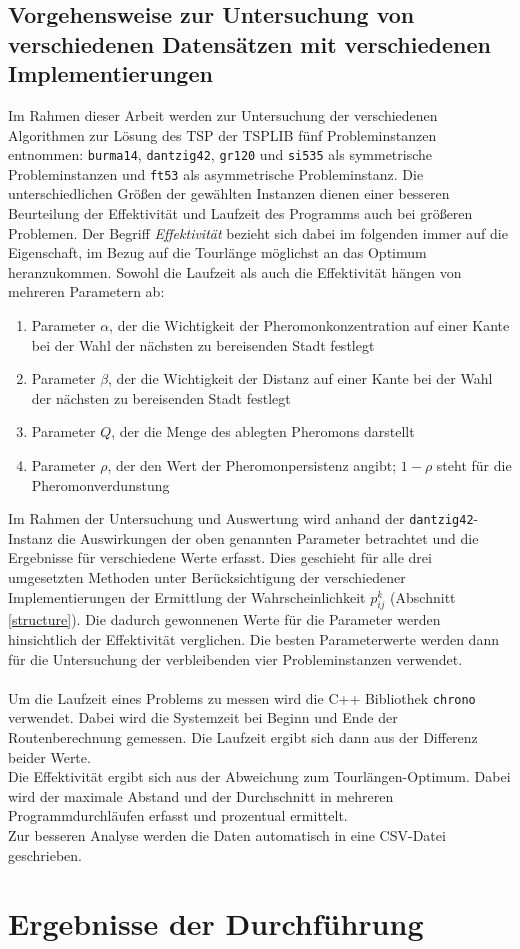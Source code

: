 \documentclass[doktyp=barbeit, sprache=german]{TUBAFarbeiten}
\begin{document}
\subsection{Vorgehensweise zur Untersuchung von verschiedenen Datensätzen mit verschiedenen Implementierungen}
Im Rahmen dieser Arbeit werden zur Untersuchung der verschiedenen Algorithmen zur Lösung des TSP der TSPLIB fünf Probleminstanzen entnommen: \texttt{burma14}, \texttt{dantzig42}, \texttt{gr120} und \texttt{si535} als symmetrische Probleminstanzen und \texttt{ft53} als asymmetrische Probleminstanz.
Die unterschiedlichen Größen der gewählten Instanzen dienen einer besseren Beurteilung der Effektivität und Laufzeit des Programms auch bei größeren Problemen.
Der Begriff \textit{Effektivität} bezieht sich dabei im folgenden immer auf die Eigenschaft, im Bezug auf die Tourlänge möglichst an das Optimum heranzukommen. Sowohl die Laufzeit als auch die Effektivität hängen von mehreren Parametern ab:
\begin{enumerate}
\item Parameter $\alpha$, der die Wichtigkeit der Pheromonkonzentration auf einer Kante bei der Wahl der nächsten zu bereisenden Stadt festlegt
\item Parameter $\beta$, der die Wichtigkeit der Distanz auf einer Kante bei der Wahl der nächsten zu bereisenden Stadt festlegt
\item Parameter $Q$, der die Menge des ablegten Pheromons darstellt
\item Parameter $\rho$, der den Wert der Pheromonpersistenz angibt; $1 - \rho$ steht für die Pheromonverdunstung
\end{enumerate}
Im Rahmen der Untersuchung und Auswertung wird anhand der \texttt{dantzig42}-Instanz die Auswirkungen der oben genannten Parameter betrachtet und die Ergebnisse für verschiedene Werte erfasst.
Dies geschieht für alle drei umgesetzten Methoden unter Berücksichtigung der verschiedener Implementierungen der Ermittlung der Wahrscheinlichkeit $p^k_{ij}$ (Abschnitt \ref{structure}).
Die dadurch gewonnenen Werte für die Parameter werden hinsichtlich der Effektivität verglichen. Die besten Parameterwerte werden dann für die Untersuchung der verbleibenden vier Probleminstanzen verwendet. 
\\\\Um die Laufzeit eines Problems zu messen wird die C++ Bibliothek \texttt{chrono} verwendet. Dabei wird die Systemzeit bei Beginn und Ende der Routenberechnung gemessen. Die Laufzeit ergibt sich dann aus der Differenz beider Werte. 
\\Die Effektivität ergibt sich aus der Abweichung zum Tourlängen-Optimum. Dabei wird der maximale Abstand und der Durchschnitt in mehreren Programmdurchläufen erfasst und prozentual ermittelt.
\\Zur besseren Analyse werden die Daten automatisch in eine CSV-Datei geschrieben.
\newpage\section{Ergebnisse der Durchführung}
\end{document}
